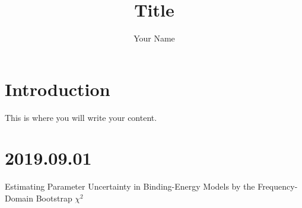 \documentclass{article}
\title{Title}
\author{Your Name}
\begin{document}
  
\maketitle{}
  
\section{Introduction}
  
This is where you will write your content.

\section{2019.09.01}
\cite{RN569,RN549} Estimating Parameter Uncertainty in Binding-Energy Models by the Frequency-Domain Bootstrap $\chi^2$\cite{PhysRevLett.119.251301,RN553,RN550}


\end{document}
